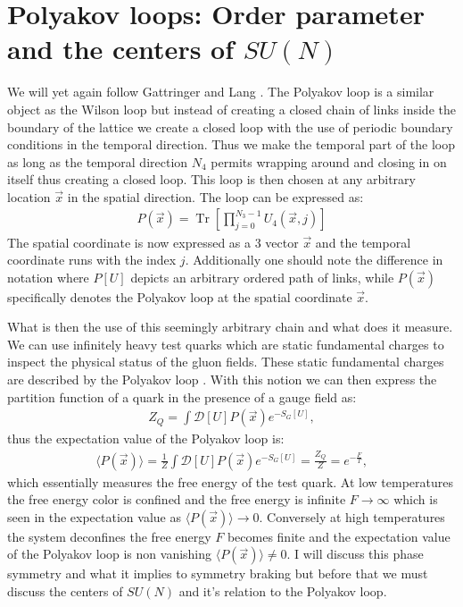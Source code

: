 \documentclass[english,twoside,openright]{UH_TCM_MSc}
\DeclareMathOperator{\Tr}{Tr}
\begin{document}
\section{Polyakov loops: Order parameter and the centers of $SU(N)$}

We will yet again follow Gattringer and Lang \cite[ch. 3.3.5]{gattringer2009quantum}. The Polyakov loop \cite{POLYAKOV197582} is a similar object as the Wilson loop \cite[ch. 3.3.1]{gattringer2009quantum} but instead of creating a closed chain of links inside the boundary of the lattice we create a closed loop with the use of periodic boundary conditions in the temporal direction. Thus we make the temporal part of the loop as long as the temporal direction $N_4$ permits wrapping around and closing in on itself thus creating a closed loop. This loop is then chosen at any arbitrary location $\vec{x}$ in the spatial direction. The loop can be expressed as:
\begin{align}
    P(\Vec{x}) = \Tr\left[\prod_{j=0}^{N_3 -1} U_4(\Vec{x},j)\right]
\end{align}
The spatial coordinate is now expressed as a 3 vector $\Vec{x}$ and the temporal coordinate runs with the index $j$. Additionally one should note the difference in notation where $P[U]$ depicts an arbitrary ordered path of links, while $P(\Vec{x})$ specifically denotes the Polyakov loop at the spatial coordinate $\Vec{x}$.

What is then the use of this seemingly arbitrary chain and what does it measure. We can use infinitely heavy test quarks which are static fundamental charges to inspect the physical status of the gluon fields. These static fundamental charges are described by the Polyakov loop \cite[ch. 2.3]{HOLLAND_2001}. With this notion we can then express the partition function of a quark in the presence of a gauge field as:
\begin{align}
    Z_Q = \int \mathcal{D}[U]P(\Vec{x}) e^{-S_G[U]},
\end{align}
thus the expectation value of the Polyakov loop is:
\begin{align}
    \langle P(\Vec{x}) \rangle = \frac{1}{Z}\int \mathcal{D}[U]P(\Vec{x}) e^{-S_G[U]} = \frac{Z_Q}{Z} = e^{-\frac{F}{T}},
\end{align}
which essentially measures the free energy of the test quark. At low temperatures the free energy color is confined and the free energy is infinite $F \rightarrow \infty$ which is seen in the expectation value as $\langle P(\Vec{x}) \rangle \rightarrow 0$. Conversely at high temperatures the system deconfines the free energy $F$ becomes finite and the expectation value of the Polyakov loop is non vanishing $\langle P(\Vec{x}) \rangle \neq 0$. I will discuss this phase symmetry and what it implies to symmetry braking but before that we must discuss the centers of $SU(N)$ and it's relation to the Polyakov loop.
\end{document}
